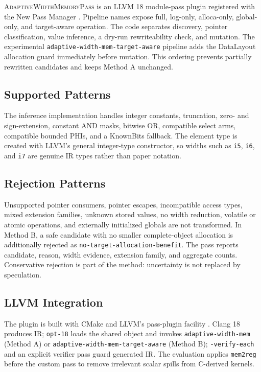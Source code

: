 \documentclass[11pt,twocolumn]{article}
\begin{document}
\textsc{AdaptiveWidthMemoryPass} is an LLVM 18 module-pass plugin registered
with the New Pass Manager \citep{llvmNewPM}. Pipeline names expose full,
log-only, alloca-only, global-only, and target-aware operation. The code separates discovery,
pointer classification, value inference, a dry-run rewriteability check, and
mutation. The experimental \texttt{adaptive-width-mem-target-aware} pipeline
adds the DataLayout allocation guard immediately before mutation. This ordering
prevents partially rewritten candidates and keeps Method A unchanged.

\subsection{Supported Patterns}

The inference implementation handles integer constants, truncation, zero- and
sign-extension, constant AND masks, bitwise OR, compatible select arms,
compatible bounded PHIs, and a KnownBits fallback. The element type is created
with LLVM's general integer-type constructor, so widths such as \texttt{i5},
\texttt{i6}, and \texttt{i7} are genuine IR types rather than paper notation.

\subsection{Rejection Patterns}

Unsupported pointer consumers, pointer escapes, incompatible access types,
mixed extension families, unknown stored values, no width reduction, volatile
or atomic operations, and externally initialized globals are not transformed.
In Method B, a safe candidate with no smaller complete-object allocation is
additionally rejected as \texttt{no-target-allocation-benefit}.
The pass reports candidate, reason, width evidence, extension family, and
aggregate counts. Conservative rejection is part of the method: uncertainty is
not replaced by speculation.

\subsection{LLVM Integration}

The plugin is built with CMake and LLVM's pass-plugin facility
\citep{lattner2004llvm}. Clang 18 produces
IR; \texttt{opt-18} loads the shared object and invokes
\texttt{adaptive-width-mem} (Method A) or
\texttt{adaptive-width-mem-target-aware} (Method B); \texttt{-verify-each} and
an explicit verifier pass guard generated IR. The evaluation applies
\texttt{mem2reg} before the custom pass to remove irrelevant scalar spills from
C-derived kernels.
\end{document}
